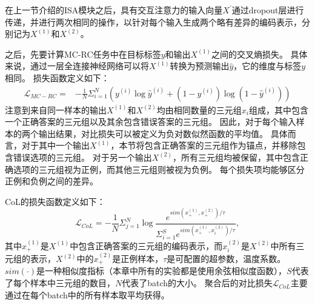 在上一节介绍的ISA模块之后，具有交互注意力的输入向量$X^{'}$通过dropout层进行传递，并进行两次相同的操作，以针对每个输入生成两个略有差异的编码表示，分别记为$X^{(1)}$和$X^{(2)}$。

之后，先要计算MC-RC任务中在目标标签$y$和输出$X^{(1)}$之间的交叉熵损失。
具体来说，通过一层全连接神经网络可以将$X^{(1)}$转换为预测输出$\hat y$，它的维度与标签$y$相同。
损失函数定义如下：
\begin{equation}
    \begin{split}
    \mathcal L_{MC-RC}=& -\frac{1}{N}\Sigma^N_{i=1}(y^{(i)}\log\hat y^{(i)}+(1-y^{(i)})\log(1-\hat y^{(i)}))
    \end{split}
\end{equation}
注意到来自同一样本的输出$X^{(1)}$和$X^{(2)}$均由相同数量的三元组$x_i$组成，其中包含一个正确答案的三元组以及其余包含错误答案的三元组。
因此，对于每个输入样本的两个输出结果，对比损失可以被定义为负对数似然函数的平均值。
具体而言，对于其中一个输出$X^{(1)}$，本节将包含正确答案的三元组作为锚点，并移除包含错误选项的三元组。
对于另一个输出$X^{(2)}$，所有三元组均被保留，其中包含正确选项的三元组视为正例，而其他三元组则被视为负例。
每个损失项均能够区分正例和负例之间的差异。

CoL的损失函数定义如下：
\begin{equation}
    \mathcal L_{CoL}=-\frac{1}{N}\Sigma^N_{j=1}\log \frac{e^{sim(x^{(1)}_+,x^{(2)}_+)/ \tau}}{\Sigma^S_{i=1} e^{sim(x^{(1)}_+,x^{(2)}_i)/ \tau}},
\end{equation}
其中$x^{(1)}_+$是$X^{(1)}$中包含正确答案的三元组的编码表示，而$x^{(2)}_i$是$X^{(2)}$中所有三元组的表示，$X^{(2)}$中的$x^{(2)}_+$是正例样本，$\tau$是可配置的超参数，温度系数。
$sim(\cdot)$是一种相似度指标（本章中所有的实验都是使用余弦相似度函数），$S$代表了每个样本中三元组的数目，$N$代表了batch的大小。
聚合后的对比损失$\mathcal L_{CoL}$主要通过在每个batch中的所有样本取平均获得。


